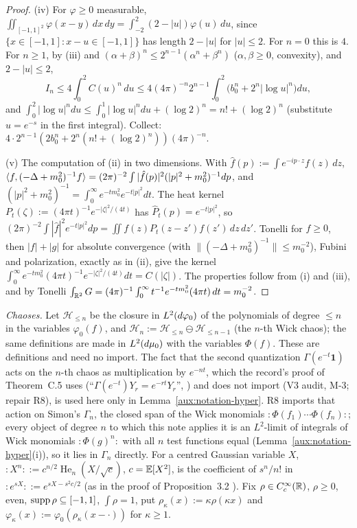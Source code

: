 \begin{proof}
(iv) For $\varphi\ge0$ measurable, $\iint_{[-1,1]^2}\varphi(x-y)\,dx\,dy=\int_{-2}^2(2-|u|)
\varphi(u)\,du$, since $\{x\in[-1,1]:x-u\in[-1,1]\}$ has length $2-|u|$ for $|u|\le2$.  For
$n=0$ this is $4$.  For $n\ge1$, by (iii) and $(\alpha+\beta)^n\le2^{n-1}(\alpha^n+\beta^n)$
($\alpha,\beta\ge0$, convexity), and $2-|u|\le2$,
\[
 I_n\le4\int_0^2C(u)^n\,du\le4(4\pi)^{-n}2^{n-1}\int_0^2\bigl(b_0^n+2^n|\log u|^n\bigr)du ,
\]
and $\int_0^2|\log u|^ndu\le\int_0^1|\log u|^ndu+(\log2)^n=n!+(\log2)^n$ (substitute $u=e^{-s}$
in the first integral).  Collect: $4\cdot2^{n-1}(2b_0^n+2^n(n!+(\log2)^n))(4\pi)^{-n}$.

(v) The computation of (ii) in two dimensions.  With $\hat f(p):=\int e^{-ip\cdot z}f(z)\,dz$,
$\langle f,(-\Delta+m_0^2)^{-1}f\rangle=(2\pi)^{-2}\int|\hat f(p)|^2(|p|^2+m_0^2)^{-1}dp$, and
$(|p|^2+m_0^2)^{-1}=\int_0^\infty e^{-tm_0^2}e^{-t|p|^2}dt$.  The heat kernel
$P_t(\zeta):=(4\pi t)^{-1}e^{-|\zeta|^2/(4t)}$ has $\hat P_t(p)=e^{-t|p|^2}$, so
$(2\pi)^{-2}\int|\hat f|^2e^{-t|p|^2}dp=\iint f(z)P_t(z-z')f(z')\,dz\,dz'$.  Tonelli for $f\ge0$,
then $|f|+|g|$ for absolute convergence (with $\|(-\Delta+m_0^2)^{-1}\|\le m_0^{-2}$), Fubini and
polarization, exactly as in (ii), give the kernel
$\int_0^\infty e^{-tm_0^2}(4\pi t)^{-1}e^{-|\zeta|^2/(4t)}dt=C(|\zeta|)$.  The properties follow
from (i) and (iii), and by Tonelli
$\int_{\mathbb{R}^2}G=(4\pi)^{-1}\int_0^\infty t^{-1}e^{-tm_0^2}(4\pi t)\,dt=m_0^{-2}$.
\end{proof}

\emph{Chaoses.}  Let $\mathcal H_{\le n}$ be the closure in $L^2(d\varphi_0)$ of the polynomials
of degree $\le n$ in the variables $\varphi_0(f)$, and $\mathcal H_n:=\mathcal
H_{\le n}\ominus\mathcal H_{\le n-1}$ (the $n$-th Wick chaos); the same definitions are made in
$L^2(d\mu_0)$ with the variables $\Phi(f)$.  These are definitions and need no import.  The fact
that the second quantization $\Gamma(e^{-t}\mathbf 1)$ acts on the $n$-th chaos as
multiplication by $e^{-nt}$, which the record's proof of Theorem~C.5 uses
(``$\Gamma(e^{-t})Y_r=e^{-rt}Y_r$'', \cite[p.~41]{R}) and does not import (V3 audit, M-3;
repair R8), is used here only in Lemma~\ref{aux:notation-hyper}.  R8 imports that action on
Simon's $\Gamma_n$, the closed span of the Wick monomials ${:}\Phi(f_1)\cdots\Phi(f_n){:}$; every
object of degree $n$ to which this note applies it is an $L^2$-limit of integrals of Wick
monomials ${:}\Phi(g)^n{:}$ with all $n$ test functions equal (Lemma~\ref{aux:notation-hyper}(i)),
so it lies in $\Gamma_n$ directly.  For a centred
Gaussian variable $X$, ${:}X^n{:}:=c^{n/2}\operatorname{He}_n(X/\sqrt c)$, $c=\mathbb{E}[X^2]$, is
the coefficient of $s^n/n!$ in ${:}e^{sX}{:}:=e^{sX-s^2c/2}$ (as in the proof of
Proposition~3.2 \cite[p.~16]{R}).  Fix $\rho\in C_c^\infty(\mathbb{R})$, $\rho\ge0$, even, $\operatorname{supp}
\rho\subseteq[-1,1]$, $\int\rho=1$, put $\rho_\kappa(x):=\kappa\rho(\kappa x)$ and
$\varphi_\kappa(x):=\varphi_0(\rho_\kappa(x-\cdot))$ for $\kappa\ge1$.

